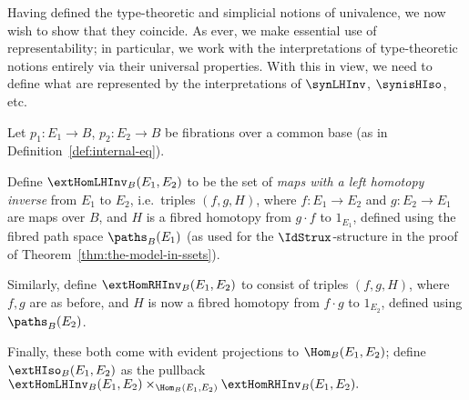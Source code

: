Having defined the type-theoretic and simplicial notions of univalence, we now wish to show that they coincide.  As ever, we make essential use of representability; in particular, we work with the interpretations of type-theoretic notions entirely via their universal properties.  With this in view, we need to define what are represented by the interpretations of $\synLHInv$, $\synisHIso$, etc.

\begin{definition}
Let $p_1 \colon E_1 \to B$, $p_2 \colon E_2 \to B$ be fibrations over a common base (as in Definition~\ref{def:internal-eq}).

Define $\extHomLHInv_B(E_1,E_2)$ to be the set of \emph{maps with a left homotopy inverse} from $E_1$ to $E_2$, i.e.\ triples $(f,g,H)$, where $f \colon E_1 \to E_2$ and $g \colon E_2 \to E_1$ are maps over $B$, and $H$ is a fibred homotopy from $g \cdot f$ to $1_{E_1}$, defined using the fibred path space $\paths_B(E_1)$ (as used for the $\IdStrux$-structure in the proof of Theorem~\ref{thm:the-model-in-ssets}).

Similarly, define $\extHomRHInv_B(E_1,E_2)$ to consist of triples $(f,g,H)$, where $f, g$ are as before, and $H$ is now a fibred homotopy from $f \cdot g$ to $1_{E_2}$, defined using $\paths_B(E_2)$.

Finally, these both come with evident projections to $\Hom_B(E_1,E_2)$; define $\extHIso_B(E_1,E_2)$ as the pullback $\extHomLHInv_B(E_1,E_2) \times_{\Hom_B(E_1,E_2)} \extHomRHInv_B(E_1,E_2).$
\end{definition}

